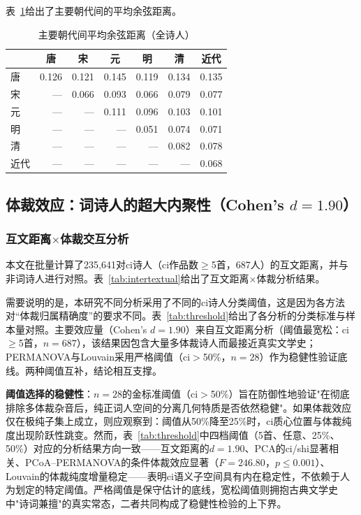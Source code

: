 \documentclass[12pt,a4paper]{article}
\numberwithin{equation}{section}
\begin{document}
表~\ref{tab:dynasty-distances}给出了主要朝代间的平均余弦距离。

\begin{table}[htbp]
  \centering
  \caption{主要朝代间平均余弦距离（全诗人）}
  \label{tab:dynasty-distances}
  \begin{tabular}{lrrrrrr}
    \toprule
              & \multicolumn{1}{c}{唐} & \multicolumn{1}{c}{宋} & \multicolumn{1}{c}{元} & \multicolumn{1}{c}{明} & \multicolumn{1}{c}{清} & \multicolumn{1}{c}{近代} \\
    \midrule
    唐  & 0.126 & 0.121 & 0.145 & 0.119 & 0.134 & 0.135 \\
    宋  & ---   & 0.066 & 0.093 & 0.066 & 0.079 & 0.077 \\
    元  & ---   & ---   & 0.111 & 0.096 & 0.103 & 0.101 \\
    明  & ---   & ---   & ---   & 0.051 & 0.074 & 0.071 \\
    清  & ---   & ---   & ---   & ---   & 0.082 & 0.078 \\
    近代& ---   & ---   & ---   & ---   & ---   & 0.068 \\
    \bottomrule
  \end{tabular}
\end{table}

\subsection{体裁效应：词诗人的超大内聚性（Cohen's $d=1.90$）}\label{sec:ci-cohesion}

\subsubsection{互文距离$\times$体裁交互分析}

本文在批量计算了235,641对ci诗人（ci作品数$\ge$5首，687人）的互文距离，并与非词诗人进行对照。表~\ref{tab:intertextual}给出了互文距离$\times$体裁分析结果。

需要说明的是，本研究不同分析采用了不同的ci诗人分类阈值，这是因为各方法对“体裁归属精确度”的要求不同。表~\ref{tab:threshold}给出了各分析的分类标准与样本量对照。主要效应量（Cohen's $d=1.90$）来自互文距离分析（阈值最宽松：ci$\ge$5首，$n=687$），该结果因包含大量多体裁诗人而最接近真实文学史；PERMANOVA与Louvain采用严格阈值（ci$>$50\%，$n=28$）作为稳健性验证底线。两种阈值互补，结论相互支撑。

\textbf{阈值选择的稳健性}：$n=28$的金标准阈值（ci$>$50\%）旨在防御性地验证"在彻底排除多体裁杂音后，纯正词人空间的分离几何特质是否依然稳健"。如果体裁效应仅在极纯子集上成立，则应观察到：阈值从50\%降至25\%时，ci质心位置与体裁纯度出现阶跃性跳变。然而，表~\ref{tab:threshold}中四档阈值（5首、任意、25\%、50\%）对应的分析结果方向一致——互文距离的$d=1.90$、PCA的ci/shi显著相关、PCoA--PERMANOVA的条件体裁效应显著（$F=246.80$，$p\leq0.001$）、Louvain的体裁纯度增量稳定——表明ci语义子空间具有内在稳定性，不依赖于人为划定的特定阈值。严格阈值是保守估计的底线，宽松阈值则拥抱古典文学史中"诗词兼擅"的真实常态，二者共同构成了稳健性检验的上下界。
\end{document}
